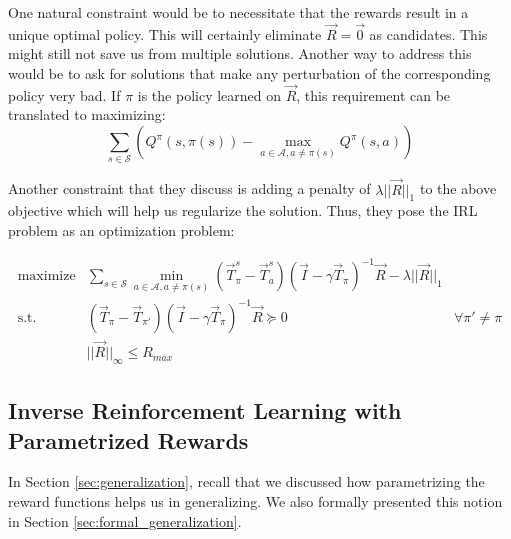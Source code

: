  One natural constraint would be to necessitate that the rewards result in a unique optimal policy. This will certainly eliminate $\vec{R} = \vec{0}$ as candidates. This might still not save us from multiple solutions. Another way to address this would be to ask for solutions that make any perturbation of the corresponding policy very bad. If $\pi$ is the policy learned on $\vec{R}$, this requirement  can be translated to maximizing:
 \[
 \sum_{s \in \mathcal{S}} \left( Q^{\pi}(s, \pi(s)) - \max\limits_{a \in \mathcal{A}, a\neq \pi(s)} Q^{\pi}(s,a) \right)
 \] 

Another constraint that they discuss is adding a penalty of $\lambda ||\vec{R}||_1$ to the above objective which will help us regularize the solution. Thus, they pose the IRL problem as an optimization problem:

\begin{equation}
\begin{array}{rll}
\text{maximize} & \displaystyle\sum\limits_{s \in \mathcal{S}} \min\limits_{a \in \mathcal{A}, a \neq \pi(s)} (\vec{T}^{s}_{\pi}- \vec{T}^{s}_{a})(\vec{I} - \gamma \vec{T}_{\pi})^{-1}\vec{R}  - \lambda ||\vec{R}||_1 &\\
\text{s.t.} &  (\vec{T}_{\pi}- \vec{T}_{\pi'})(\vec{I} - \gamma \vec{T}_{\pi})^{-1}\vec{R}  \succcurlyeq 0 & \forall \pi' \neq \pi \\
& ||\vec{R}||_{\infty} \leq R_{max}
\end{array}
\end{equation}


\subsection{Inverse Reinforcement Learning with Parametrized Rewards}



 In Section \ref{sec:generalization}, recall that we discussed how parametrizing the reward functions helps us in generalizing. We also formally presented this notion in Section \ref{sec:formal_generalization}. 
 
% 
 
